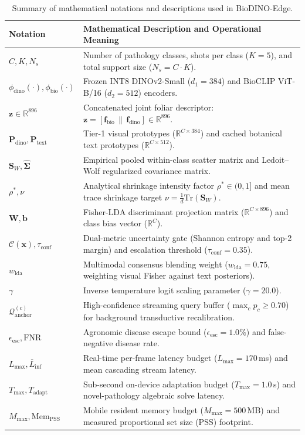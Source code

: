 \begin{table}[htbp]
\caption{Summary of mathematical notations and descriptions used in BioDINO-Edge.}
\label{tab:notation}
\centering
\footnotesize
\begin{tabularx}{\textwidth}{lX}
\toprule
\textbf{Notation} & \textbf{Mathematical Description and Operational Meaning} \\
\midrule
$C, K, N_s$ & Number of pathology classes, shots per class ($K=5$), and total support size ($N_s = C \cdot K$). \\
$\phi_{\text{dino}}(\cdot), \phi_{\text{bio}}(\cdot)$ & Frozen INT8 DINOv2-Small ($d_1 = 384$) and BioCLIP ViT-B/16 ($d_2 = 512$) encoders. \\
$\mathbf{z} \in \mathbb{R}^{896}$ & Concatenated joint foliar descriptor: $\mathbf{z} = [\mathbf{f}_{\text{bio}} \,\|\, \mathbf{f}_{\text{dino}}] \in \mathbb{R}^{896}$. \\
$\mathbf{P}_{\text{dino}}, \mathbf{P}_{\text{text}}$ & Tier-1 visual prototypes ($\mathbb{R}^{C \times 384}$) and cached botanical text prototypes ($\mathbb{R}^{C \times 512}$). \\
$\mathbf{S}_W, \hat{\mathbf{\Sigma}}$ & Empirical pooled within-class scatter matrix and Ledoit--Wolf regularized covariance matrix. \\
$\rho^*, \nu$ & Analytical shrinkage intensity factor $\rho^* \in (0, 1]$ and mean trace shrinkage target $\nu = \frac{1}{d}\text{Tr}(\mathbf{S}_W)$. \\
$\mathbf{W}, \mathbf{b}$ & Fisher-LDA discriminant projection matrix ($\mathbb{R}^{C \times 896}$) and class bias vector ($\mathbb{R}^C$). \\
$\mathcal{C}(\mathbf{x}), \tau_{\text{conf}}$ & Dual-metric uncertainty gate (Shannon entropy and top-2 margin) and escalation threshold ($\tau_{\text{conf}} = 0.35$). \\
$w_{\text{lda}}$ & Multimodal consensus blending weight ($w_{\text{lda}} = 0.75$, weighting visual Fisher against text posteriors). \\
$\gamma$ & Inverse temperature logit scaling parameter ($\gamma = 20.0$). \\
$\mathcal{Q}_{\text{anchor}}^{(c)}$ & High-confidence streaming query buffer ($\max_c p_c \ge 0.70$) for background transductive recalibration. \\
$\epsilon_{\text{esc}}, \text{FNR}$ & Agronomic disease escape bound ($\epsilon_{\text{esc}} = 1.0\%$) and false-negative disease rate. \\
$L_{\max}, \overline{L}_{\text{inf}}$ & Real-time per-frame latency budget ($L_{\max} = 170$\,ms) and mean cascading stream latency. \\
$T_{\max}, T_{\text{adapt}}$ & Sub-second on-device adaptation budget ($T_{\max} = 1.0$\,s) and novel-pathology algebraic solve latency. \\
$M_{\max}, \text{Mem}_{\text{PSS}}$ & Mobile resident memory budget ($M_{\max} = 500$\,MB) and measured proportional set size (PSS) footprint. \\
\bottomrule
\end{tabularx}
\end{table}


